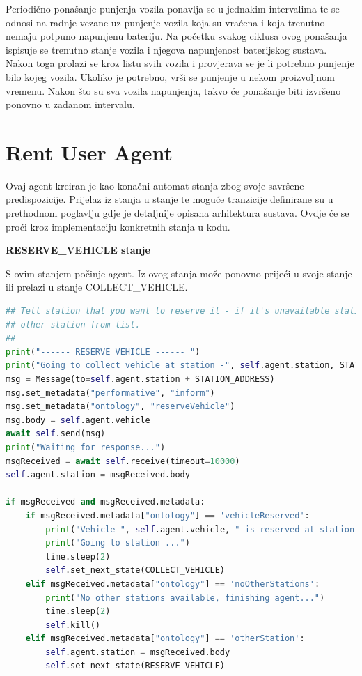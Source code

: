 \documentclass{foi}
\begin{document}
Periodično ponašanje punjenja vozila ponavlja se u jednakim intervalima te se odnosi na radnje vezane uz punjenje vozila koja su vraćena i koja trenutno nemaju potpuno napunjenu bateriju. Na početku svakog ciklusa ovog ponašanja ispisuje se trenutno stanje vozila i njegova napunjenost baterijskog sustava. Nakon toga prolazi se kroz listu svih vozila i provjerava se je li potrebno punjenje bilo kojeg vozila. Ukoliko je potrebno, vrši se punjenje u nekom proizvoljnom vremenu. Nakon što su sva vozila napunjenja, takvo će ponašanje biti izvršeno ponovno u zadanom intervalu.

\section{Rent User Agent}

Ovaj agent kreiran je kao konačni automat stanja zbog svoje savršene predispozicije. Prijelaz iz stanja u stanje te moguće tranzicije definirane su u prethodnom poglavlju gdje je detaljnije opisana arhitektura sustava. Ovdje će se proći kroz implementaciju konkretnih stanja u kodu.

\begin{flushleft}\textbf{RESERVE\_VEHICLE stanje}\end{flushleft}

S ovim stanjem počinje agent. Iz ovog stanja može ponovno prijeći u svoje stanje ili prelazi u stanje COLLECT\_VEHICLE.

\begin{lstlisting}[language=Python]
 ## Tell station that you want to reserve it - if it's unavailable station will give you
## other station from list.
##
print("------ RESERVE VEHICLE ------ ")
print("Going to collect vehicle at station -", self.agent.station, STATION_ADDRESS)
msg = Message(to=self.agent.station + STATION_ADDRESS)
msg.set_metadata("performative", "inform")
msg.set_metadata("ontology", "reserveVehicle")
msg.body = self.agent.vehicle
await self.send(msg)
print("Waiting for response...")
msgReceived = await self.receive(timeout=10000)
self.agent.station = msgReceived.body

if msgReceived and msgReceived.metadata:
	if msgReceived.metadata["ontology"] == 'vehicleReserved':
		print("Vehicle ", self.agent.vehicle, " is reserved at station ", msgReceived.body)
		print("Going to station ...")
		time.sleep(2)
		self.set_next_state(COLLECT_VEHICLE)
	elif msgReceived.metadata["ontology"] == 'noOtherStations':
		print("No other stations available, finishing agent...")
		time.sleep(2)
		self.kill()
	elif msgReceived.metadata["ontology"] == 'otherStation':
		self.agent.station = msgReceived.body
		self.set_next_state(RESERVE_VEHICLE)
\end{lstlisting}
\end{document}
